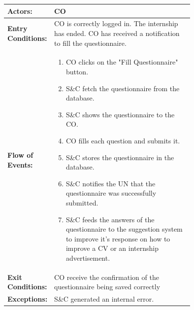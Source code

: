 \begin{center}
    \begin{longtable}{|l|p{0.75\linewidth}|}
        \hline
        \textbf{Actors:}           & CO                                                                                                                                                        \\
        \hline
        \textbf{Entry Conditions:} & CO is correctly logged in. The internship has ended. CO has received a notification to fill the questionnaire.                                            \\
        \hline
        \textbf{Flow of Events:}   & \begin{enumerate}
                                         \item CO clicks on the "Fill Questionnaire" button.
                                         \item S\&C fetch the questionnaire from the database.
                                         \item S\&C shows the questionnaire to the CO.
                                         \item CO fills each question and submits it.
                                         \item S\&C stores the questionnaire in the database.
                                         \item S\&C notifies the UN that the questionnaire was successfully submitted.
                                         \item S\&C feeds the answers of the questionnaire to the suggestion system to improve it's response on how to improve a CV or an internship advertisement.
                                     \end{enumerate} \\
        \hline
        \textbf{Exit Conditions:}  & CO receive the confirmation of the questionnaire being saved correctly                                                                                    \\
        \hline
        \textbf{Exceptions:}       & S\&C generated an internal error.                                                                                                                         \\
        \hline
    \end{longtable}
\end{center}

